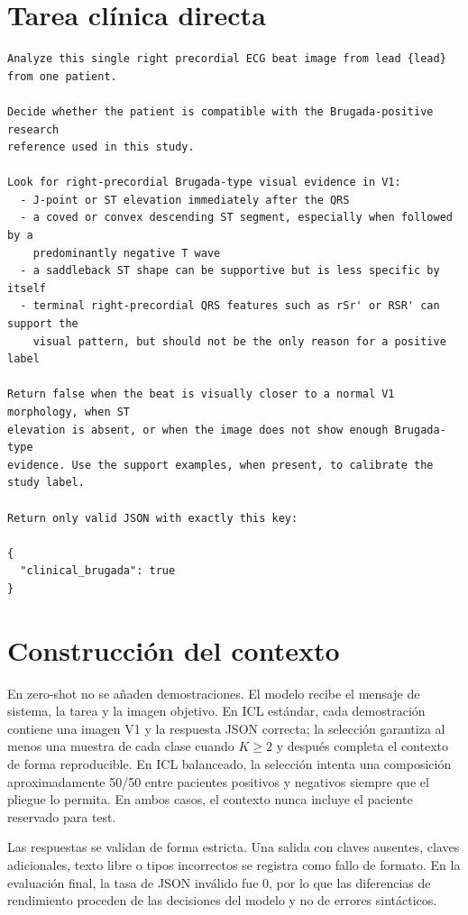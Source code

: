 \section{Tarea cl\'inica directa}

\begin{lstlisting}
Analyze this single right precordial ECG beat image from lead {lead} from one patient.

Decide whether the patient is compatible with the Brugada-positive research
reference used in this study.

Look for right-precordial Brugada-type visual evidence in V1:
  - J-point or ST elevation immediately after the QRS
  - a coved or convex descending ST segment, especially when followed by a
    predominantly negative T wave
  - a saddleback ST shape can be supportive but is less specific by itself
  - terminal right-precordial QRS features such as rSr' or RSR' can support the
    visual pattern, but should not be the only reason for a positive label

Return false when the beat is visually closer to a normal V1 morphology, when ST
elevation is absent, or when the image does not show enough Brugada-type
evidence. Use the support examples, when present, to calibrate the study label.

Return only valid JSON with exactly this key:

{
  "clinical_brugada": true
}
\end{lstlisting}

\section{Construcci\'on del contexto}

En zero-shot no se a\~naden demostraciones. El modelo recibe el mensaje de sistema, la tarea y la imagen objetivo. En ICL estándar, cada demostraci\'on contiene una imagen V1 y la respuesta JSON correcta; la selecci\'on garantiza al menos una muestra de cada clase cuando \(K \geq 2\) y despu\'es completa el contexto de forma reproducible. En ICL balanceado, la selecci\'on intenta una composici\'on aproximadamente 50/50 entre pacientes positivos y negativos siempre que el pliegue lo permita. En ambos casos, el contexto nunca incluye el paciente reservado para test.

Las respuestas se validan de forma estricta. Una salida con claves ausentes, claves adicionales, texto libre o tipos incorrectos se registra como fallo de formato. En la evaluaci\'on final, la tasa de JSON inv\'alido fue 0, por lo que las diferencias de rendimiento proceden de las decisiones del modelo y no de errores sint\'acticos.
